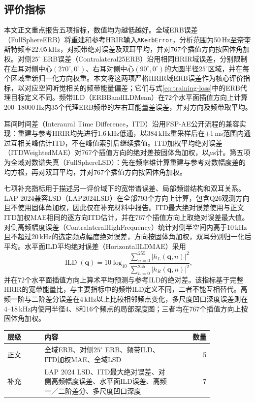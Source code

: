 \documentclass[UTF8,a4paper]{article}
\begin{document}
\subsection{评价指标}
本文正文重点报告五项指标，数值均为越低越好。全域ERB误差（FullSphereERB）将重建和参考HRIR输入\texttt{AKerbError}，分析范围为50\,Hz至奈奎斯特频率22.05\,kHz，对频带绝对误差及双耳平均，并对767个插值方向按固体角加权。对侧$25^\circ$ ERB误差（Contralateral25ERB）沿用相同HRIR域误差，分别限制在左耳对侧中心$(270^\circ,0^\circ)$、右耳对侧中心$(90^\circ,0^\circ)$的大圆半径$25^\circ$区域，并在每个区域重新归一化方向权重。本文将这两项严格HRIR域ERB误差作为核心评价指标，以对应空间听觉相关的频带能量偏差；它们与式\eqref{eq:training-loss}中的ERB代理目标定义不同。频带ILD（ERBBandILDMean）在72个水平面插值方向上计算200--18000\,Hz内35个代理ERB频带的左右耳能量差误差，并对方向及频带取平均。

耳间时间差（Interaural Time Difference，ITD）沿用FSP-AE公开流程的兼容实现\cite{R4}：重建与参考HRIR均先进行1.6\,kHz低通，以384\,kHz重采样后在$\pm1$\,ms范围内通过互相关峰估计ITD，不在峰值索引后继续插值。ITD加权平均绝对误差（ITDWeightedMAE）对767个插值方向的绝对差按固体角加权，以$\mu$s计。第五项为全域对数谱失真（FullSphereLSD）：先在频率维计算重建与参考对数幅度差的均方根，再对双耳平均，并对767个插值方向按固体角加权。

七项补充指标用于描述另一评价域下的宽带谱误差、局部频谱结构和双耳关系。LAP 2024兼容LSD（LAP2024LSD）在全部793个方向上计算，包含Q26观测方向且不使用固体角加权，因此仅在补充材料中报告。ITD最大绝对误差使用与正文ITD加权MAE相同的逐方向ITD估计，并在767个插值方向上取绝对误差最大值。对侧高频幅度误差（ContralateralHighFrequency）统计对侧半空间内高于10\,kHz且不超过20\,kHz的选定频点幅度绝对误差，方向按固体角加权，双耳分别归一化后平均。水平面ILD平均绝对误差（HorizontalILDMAE）采用
\begin{equation}
\operatorname{ILD}(\mathbf q)=10\log_{10}
\frac{\sum_{n=0}^{255}|h_L(\mathbf q,n)|^2}
     {\sum_{n=0}^{255}|h_R(\mathbf q,n)|^2},
\end{equation}
并在72个水平面插值方向上算术平均预测与参考ILD的绝对差。该指标基于完整HRIR的宽带能量比，与主要指标中的频带ILD定义不同，二者不能互相替代。高频一阶与二阶差分误差在4\,kHz以上比较相邻频点变化，多尺度凹口深度误差则在4--18\,kHz内使用半径4、8和16个频点的局部深度图；三者均在767个插值方向上按固体角加权。

\begin{table}[htbp]
\centering\small
{}
\begin{tabular}{p{0.18\linewidth}p{0.65\linewidth}r}
\toprule
层级 & 内容 & 数量\\
\midrule
正文 & 全域ERB、对侧$25^\circ$ ERB、频带ILD、ITD加权MAE、全域LSD & 5\\
补充 & LAP 2024 LSD、ITD最大绝对误差、对侧高频幅度误差、水平面ILD误差、高频一／二阶差分、多尺度凹口深度 & 7\\
\bottomrule
\end{tabular}
\end{table}
\end{document}
